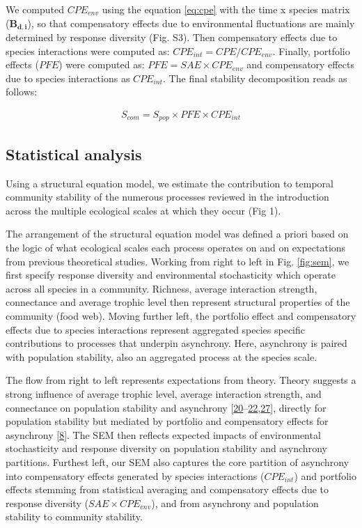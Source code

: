 \documentclass[
]{article}
\begin{document}
We computed \(CPE_{env}\) using the equation \eqref{eq:cpe} with the time x species
matrix (\(\mathbf{B_{d, i}}\)), so that compensatory effects due to environmental
fluctuations are mainly determined by response diversity (Fig. S3). Then
compensatory effects due to species interactions were computed as:
\(CPE_{int} = CPE / CPE_{env}\). Finally, portfolio effects (\(PFE\)) were computed
as: \(PFE = SAE \times CPE_{env}\) and compensatory effects due to species
interactions as \(CPE_{int}\). The final stability decomposition reads as follows:

\begin{equation}
\begin{aligned}
S_{com} = S_{pop} \times PFE \times CPE_{int}
\label{eq:scom3}
\end{aligned}
\end{equation}

\hypertarget{statistical-analysis}{%
\subsection{Statistical analysis}\label{statistical-analysis}}

Using a structural equation model, we estimate the contribution to temporal
community stability of the numerous processes reviewed in the introduction
across the multiple ecological scales at which they occur (Fig 1).

The arrangement of the structural equation model was defined a priori based on
the logic of what ecological scales each process operates on and on
expectations from previous theoretical studies. Working from right to left in
Fig. \ref{fig:sem}, we first specify response diversity and environmental stochasticity
which operate across all species in a community. Richness, average interaction
strength, connectance and average trophic level then represent structural
properties of the community (food web). Moving further left, the portfolio
effect and compensatory effects due to species interactions represent
aggregated species specific contributions to processes that underpin
asynchrony. Here, asynchrony is paired with population stability,
also an aggregated process at the species scale.

The flow from right to left represents expectations from theory. Theory
suggests a strong influence of average trophic level, average interaction
strength, and connectance on population stability and asynchrony
{[}\protect\hyperlink{ref-mccann_weak_1998}{20}--\protect\hyperlink{ref-fahimipour_compensation_2017}{22},\protect\hyperlink{ref-mccann_reevaluating_1997}{27}{]}, directly for population stability but mediated by portfolio and
compensatory effects for asynchrony {[}\protect\hyperlink{ref-zhao_biodiversity_2022}{8}{]}. The SEM then reflects expected
impacts of environmental stochasticity and response diversity on population
stability and asynchrony partitions. Furthest left, our SEM also captures the
core partition of asynchrony into compensatory effects generated by species
interactions (\(CPE_{int}\)) and portfolio effects stemming from statistical averaging
and compensatory effects due to response diversity (\(SAE \times CPE_{env}\)), and from
asynchrony and population stability to community stability.
\end{document}
